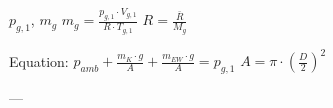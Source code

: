 \( p_{g,1} \), \( m_g \)  
\( m_g = \frac{p_{g,1} \cdot V_{g,1}}{R \cdot T_{g,1}} \)  
\( R = \frac{\bar{R}}{M_g} \)  

Equation:  
\( p_{amb} + \frac{m_K \cdot g}{A} + \frac{m_{EW} \cdot g}{A} = p_{g,1} \)  
\( A = \pi \cdot \left(\frac{D}{2}\right)^2 \)  

---